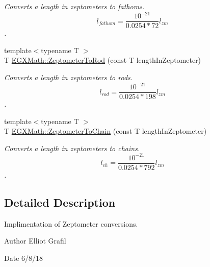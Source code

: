 \begin{DoxyCompactItemize}
\begin{DoxyCompactList}\small\item\em Converts a length in zeptometers to fathoms. \[ l_{fathom}= \frac{10^{-21}}{0.0254 * 72} l_{zm} \]. \end{DoxyCompactList}\item 
{\footnotesize template$<$typename T $>$ }\\T \mbox{\hyperlink{group___e_g_x_math-_conversions-_length_conversions-_s_i-_zeptometer-_surveyors_gac0c6193e55739ec7f4c3769ebddb65e2}{E\+G\+X\+Math\+::\+Zeptometer\+To\+Rod}} (const T length\+In\+Zeptometer)
\begin{DoxyCompactList}\small\item\em Converts a length in zeptometers to rods. \[ l_{rod}= \frac{10^{-21}}{0.0254 * 198} l_{zm} \]. \end{DoxyCompactList}\item 
{\footnotesize template$<$typename T $>$ }\\T \mbox{\hyperlink{group___e_g_x_math-_conversions-_length_conversions-_s_i-_zeptometer-_surveyors_gaf9fce38080eb9c090004c9df2a5dead1}{E\+G\+X\+Math\+::\+Zeptometer\+To\+Chain}} (const T length\+In\+Zeptometer)
\begin{DoxyCompactList}\small\item\em Converts a length in zeptometers to chains. \[ l_{ch}= \frac{10^{-21}}{0.0254 * 792} l_{zm} \]. \end{DoxyCompactList}\end{DoxyCompactItemize}


\subsection{Detailed Description}
Implimentation of Zeptometer conversions. 

\begin{DoxyAuthor}{Author}
Elliot Grafil 
\end{DoxyAuthor}
\begin{DoxyDate}{Date}
6/8/18 
\end{DoxyDate}

